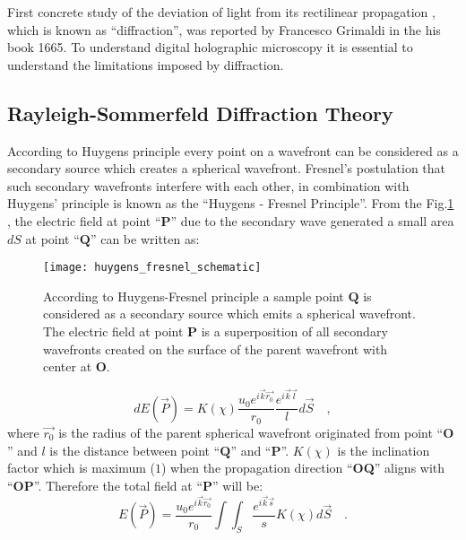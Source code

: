 First concrete study of the deviation of light from its rectilinear propagation \cite{hechtoptics}, which is known as ``diffraction'', was reported by Francesco Grimaldi \cite{bornwolf} in the his book 1665. To understand digital holographic microscopy \cite{Lee:07} it is essential to understand the limitations imposed by diffraction.

\subsection{Rayleigh-Sommerfeld Diffraction Theory}
According to Huygens principle every point on a wavefront can be considered as a secondary source which creates a spherical wavefront. Fresnel's postulation that such secondary wavefronts interfere with each other, in combination with Huygens' principle is known as the ``Huygens - Fresnel Principle''. From the Fig.\ref{fig:huygens_fresnel} , the electric field at point ``$\mathbf{P}$'' due to the secondary wave generated a small area $dS$ at point ``$\mathbf{Q}$'' can be written as:

\begin{figure}[t!]
  \centering
  \texttt{[image: huygens\_fresnel\_schematic]}
  \caption{According to Huygens-Fresnel principle a sample point $\mathbf{Q}$ is considered as a secondary source which emits a spherical wavefront. The electric field at point $\mathbf{P}$ is a superposition of all secondary wavefronts created on the surface of the parent wavefront with center at $\mathbf{O}$.}
  \label{fig:huygens_fresnel}
\end{figure}


\begin{equation}
\label{eq:huygen_fresnel}
dE(\vec{P}) = K(\chi) \frac{u_0 e^{i\vec{k}\vec{r_0}}}{r_0}\frac{e^{i\vec{k}\vec{l}}}{l} d\vec{S} \quad ,
\end{equation}
where $\vec{r_0}$ is the radius of the parent spherical wavefront originated from point ``$\mathbf{O}$'' and $l$ is the distance between point ``$\mathbf{Q}$'' and ``$\mathbf{P}$''. $K(\chi)$ is the inclination factor which is maximum ($1$) when the propagation direction ``\textbf{OQ}'' aligns with ``\textbf{OP}''. Therefore the total field at ``\textbf{P}'' will be:
\begin{equation}
\label{eq:E_P}
E(\vec{P}) =  \frac{u_0 e^{i\vec{k}\vec{r_0}}}{r_0} \int \int _{S} \frac{e^{i\vec{k}\vec{s}}}{s}  K(\chi) d\vec{S} \quad .
\end{equation}

